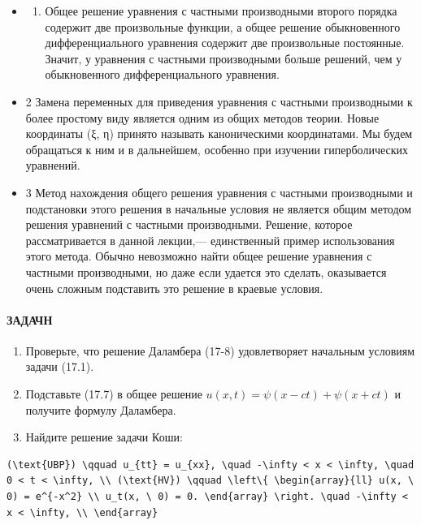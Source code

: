 \documentclass[
  ukrainian,
]{article}
\providecommand{\tightlist}{%
  \setlength{\itemsep}{0pt}\setlength{\parskip}{0pt}}
\begin{document}
\begin{itemize}
\tightlist
\item
  \begin{enumerate}
  \def\labelenumi{\arabic{enumi}.}
  \tightlist
  \item
    Общее решение уравнения с частными производными второго порядка
    содержит две произвольные функции, а общее решение обыкновенного
    дифференциального уравнения содержит две произвольные постоянные.
    Значит, у уравнения с частными производными больше решений, чем у
    обыкновенного дифференциального уравнения.
  \end{enumerate}
\item
  2 Замена переменных для приведения уравнения с частными производными к
  более простому виду является одним из общих методов теории. Новые
  координаты (ξ, η) принято называть каноническими координатами. Мы
  будем обращаться к ним и в дальнейшем, особенно при изучении
  гиперболических уравнений.
\item
  3 Метод нахождения общего решения уравнения с частными производными и
  подстановки этого решения в начальные условия не является общим
  методом решения уравнений с частными производными. Решение, которое
  рассматривается в данной лекции,--- единственный пример использования
  этого метода. Обычно невозможно найти общее решение уравнения с
  частными производными, но даже если удается это сделать, оказывается
  очень сложным подставить это решение в краевые условия.
\end{itemize}

\paragraph{ЗАДАЧН}\label{ux437ux430ux434ux430ux447ux43d}

\begin{enumerate}
\def\labelenumi{\arabic{enumi}.}
\item
  Проверьте, что решение Даламбера (17-8) удовлетворяет начальным
  условиям задачи (17.1).
\item
  Подставьте (17.7) в общее решение
  \(u(x, t) = \psi(x - ct) + \psi(x + ct)\) и получите формулу
  Даламбера.
\item
  Найдите решение задачи Коши:
\end{enumerate}

\begin{verbatim}
(\text{UBP}) \qquad u_{tt} = u_{xx}, \quad -\infty < x < \infty, \quad 0 < t < \infty, \\ (\text{HV}) \qquad \left\{ \begin{array}{ll} u(x, \ 0) = e^{-x^2} \\ u_t(x, \ 0) = 0. \end{array} \right. \quad -\infty < x < \infty, \\ \end{array}
\end{verbatim}
\end{document}
